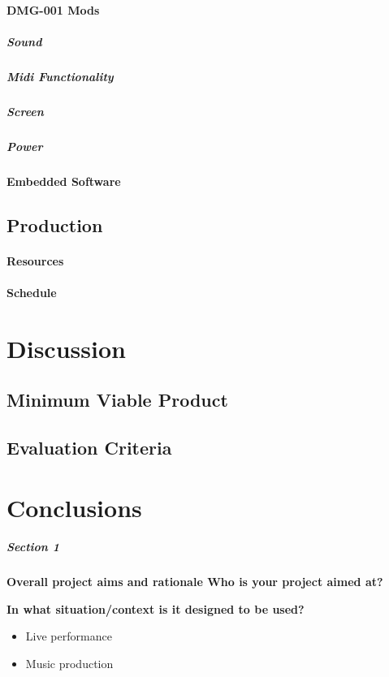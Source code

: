 \documentclass[]{article}
\begin{document}
        \paragraph{DMG-001 Mods}
            \subparagraph{Sound}
            \subparagraph{Midi Functionality}
            \subparagraph{Screen}
            \subparagraph{Power}
        \paragraph{Embedded Software}
    \subsection{Production}
        \paragraph{Resources}
        \paragraph{Schedule}

\section{Discussion}
    \subsection{Minimum Viable Product}
    \subsection{Evaluation Criteria}

\section{Conclusions}







\subparagraph[]{Section 1}
    \textbf{Overall project aims and rationale Who is your project aimed at?}

    \textbf{In what situation/context is it designed to be used?}
    
        \begin{itemize}
        \item Live performance
        \item Music production
        \end{itemize}
\end{document}
